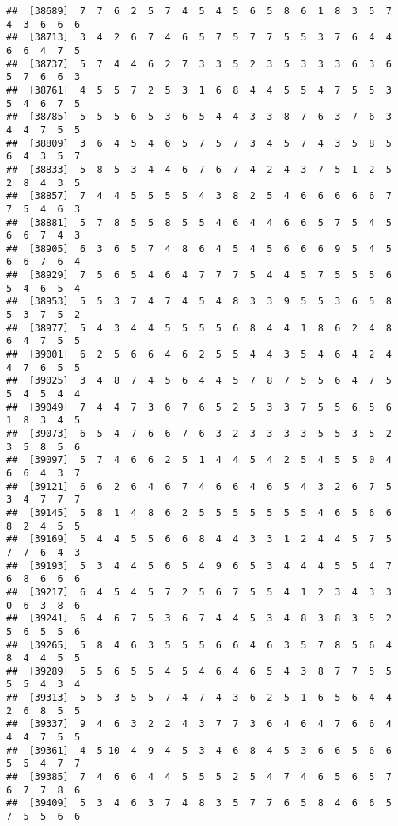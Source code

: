 \documentclass[
]{book}
\begin{document}
\begin{verbatim}
##  [38689]  7  7  6  2  5  7  4  5  4  5  6  5  8  6  1  8  3  5  7  4  3  6  6  6
##  [38713]  3  4  2  6  7  4  6  5  7  5  7  7  5  5  3  7  6  4  4  6  6  4  7  5
##  [38737]  5  7  4  4  6  2  7  3  3  5  2  3  5  3  3  3  6  3  6  5  7  6  6  3
##  [38761]  4  5  5  7  2  5  3  1  6  8  4  4  5  5  4  7  5  5  3  5  4  6  7  5
##  [38785]  5  5  5  6  5  3  6  5  4  4  3  3  8  7  6  3  7  6  3  4  4  7  5  5
##  [38809]  3  6  4  5  4  6  5  7  5  7  3  4  5  7  4  3  5  8  5  6  4  3  5  7
##  [38833]  5  8  5  3  4  4  6  7  6  7  4  2  4  3  7  5  1  2  5  2  8  4  3  5
##  [38857]  7  4  4  5  5  5  5  4  3  8  2  5  4  6  6  6  6  6  7  7  5  4  6  3
##  [38881]  5  7  8  5  5  8  5  5  4  6  4  4  6  6  5  7  5  4  5  6  6  7  4  3
##  [38905]  6  3  6  5  7  4  8  6  4  5  4  5  6  6  6  9  5  4  5  6  6  7  6  4
##  [38929]  7  5  6  5  4  6  4  7  7  7  5  4  4  5  7  5  5  5  6  5  4  6  5  4
##  [38953]  5  5  3  7  4  7  4  5  4  8  3  3  9  5  5  3  6  5  8  5  3  7  5  2
##  [38977]  5  4  3  4  4  5  5  5  5  6  8  4  4  1  8  6  2  4  8  6  4  7  5  5
##  [39001]  6  2  5  6  6  4  6  2  5  5  4  4  3  5  4  6  4  2  4  4  7  6  5  5
##  [39025]  3  4  8  7  4  5  6  4  4  5  7  8  7  5  5  6  4  7  5  5  4  5  4  4
##  [39049]  7  4  4  7  3  6  7  6  5  2  5  3  3  7  5  5  6  5  6  1  8  3  4  5
##  [39073]  6  5  4  7  6  6  7  6  3  2  3  3  3  3  5  5  3  5  2  3  5  8  5  6
##  [39097]  5  7  4  6  6  2  5  1  4  4  5  4  2  5  4  5  5  0  4  6  6  4  3  7
##  [39121]  6  6  2  6  4  6  7  4  6  6  4  6  5  4  3  2  6  7  5  3  4  7  7  7
##  [39145]  5  8  1  4  8  6  2  5  5  5  5  5  5  5  4  6  5  6  6  8  2  4  5  5
##  [39169]  5  4  4  5  5  6  6  8  4  4  3  3  1  2  4  4  5  7  5  7  7  6  4  3
##  [39193]  5  3  4  4  5  6  5  4  9  6  5  3  4  4  4  5  5  4  7  6  8  6  6  6
##  [39217]  6  4  5  4  5  7  2  5  6  7  5  5  4  1  2  3  4  3  3  0  6  3  8  6
##  [39241]  6  4  6  7  5  3  6  7  4  4  5  3  4  8  3  8  3  5  2  5  6  5  5  6
##  [39265]  5  8  4  6  3  5  5  5  6  6  4  6  3  5  7  8  5  6  4  8  4  4  5  5
##  [39289]  5  5  6  5  5  4  5  4  6  4  6  5  4  3  8  7  7  5  5  5  5  4  3  4
##  [39313]  5  5  3  5  5  7  4  7  4  3  6  2  5  1  6  5  6  4  4  2  6  8  5  5
##  [39337]  9  4  6  3  2  2  4  3  7  7  3  6  4  6  4  7  6  6  4  4  4  7  5  5
##  [39361]  4  5 10  4  9  4  5  3  4  6  8  4  5  3  6  6  5  6  6  5  5  4  7  7
##  [39385]  7  4  6  6  4  4  5  5  5  2  5  4  7  4  6  5  6  5  7  6  7  7  8  6
##  [39409]  5  3  4  6  3  7  4  8  3  5  7  7  6  5  8  4  6  6  5  7  5  5  6  6

\end{verbatim}
\end{document}
